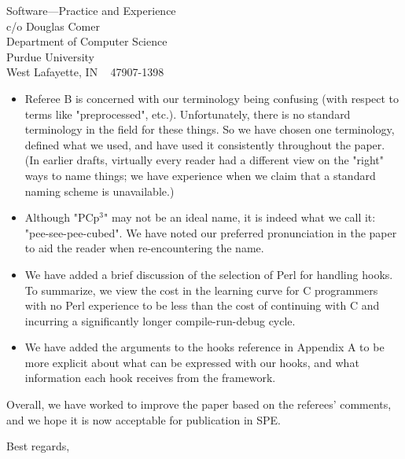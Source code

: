 \documentclass{letter}
\newcommand{\pcp}{\mbox{\textsf{PCp}$^3$}}
\begin{document}
\begin{letter}{
Software---Practice and Experience \\
c/o Douglas Comer \\
Department of Computer Science \\
Purdue University \\
West Lafayette, IN ~ 47907-1398}
\begin{itemize}
\item Referee B is concerned with our terminology being confusing (with
respect to terms like "preprocessed", etc.).  Unfortunately, there is no
standard terminology in the field for these things.  So we have chosen one
terminology, defined what we used, and have used it consistently throughout
the paper.  (In earlier drafts, virtually every reader had a different view
on the "right" ways to name things; we have experience when we claim
that a standard naming scheme is unavailable.)

\item Although "\pcp" may not be an ideal name, it is indeed what we call
it: "pee-see-pee-cubed".  We have noted our preferred pronunciation in
the paper to aid the reader when re-encountering the name.

\item We have added a brief discussion of the selection of Perl for
handling hooks.  To summarize, we view the cost in the learning curve for C
programmers with no Perl experience to be less than the cost of continuing
with C and incurring a significantly longer compile-run-debug cycle.

\item We have added the arguments to the hooks reference in Appendix A 
      to be more explicit about what can be expressed with our hooks,
      and what information each hook receives from the framework.

\end{itemize}

Overall, we have worked to improve the paper based on the referees'
comments, and we hope it is now acceptable for publication in SPE.

\closing{Best regards,}
\end{letter}
\end{document}
